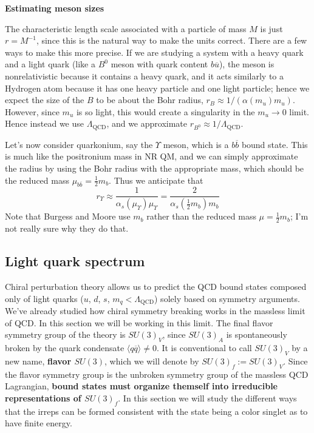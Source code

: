 \documentclass[11pt, oneside]{article}   	%
\theoremstyle{definition}
\numberwithin{equation}{subsection}		%
\newenvironment{answer}{\begin{center}\begin{answerbox}}{\end{answerbox}\end{center}}
\begin{document}

\begin{answer}
\textbf{Estimating meson sizes} 

\begin{flushleft} \setlength{\parindent}{2em}
The characteristic length scale associated with a particle of mass $M$ is just $r = M^{-1}$, since this is the natural way to make the units 
correct. There are a few ways to make this more precise. If we are studying a system with a heavy quark and a light quark (like a $B^0$ 
meson with quark content $b\overline u$), the meson is nonrelativistic because it contains a heavy quark, and it acts similarly to a 
Hydrogen atom because it has one heavy particle and one light particle; hence we expect the size of the $B$ to be about the Bohr 
radius, $r_B\approx 1 / (\alpha(m_u) m_u)$. However, since $m_u$ is so light, this would create a singularity in the $m_u\rightarrow 0$ 
limit. Hence instead we use $\Lambda_\mathrm{QCD}$, and we approximate $r_{B^0}\approx 1 / \Lambda_\mathrm{QCD}$. 

Let's now consider quarkonium, say the $\Upsilon$ meson, which is a $b\overline b$ bound state. This is much like the positronium 
mass in NR QM, and we can simply approximate the radius by using the Bohr radius with the appropriate mass, which should be the 
reduced mass $\mu_{b\overline b} = \frac{1}{2} m_b$. Thus we anticipate that
\begin{equation}
	r_\Upsilon\approx \frac{1}{\alpha_s(\mu_\Upsilon)\mu_\Upsilon} = \frac{2}{\alpha_s(\frac{1}{2} m_b) m_b} 
\end{equation}
Note that Burgess and Moore use $m_b$ rather than the reduced mass $\mu = \frac{1}{2} m_b$; I'm not really sure why they do that.
\end{flushleft}
\end{answer}

\subsection{Light quark spectrum}

Chiral perturbation theory allows us to predict the QCD bound states composed only of light quarks ($u$, $d$, $s$, $m_q < \Lambda_\mathrm{QCD}$) 
solely based on symmetry arguments. We've already studied how chiral symmetry breaking works in the massless limit of QCD. In this section we will 
be working in this limit. The final flavor symmetry group of the theory is $SU(3)_V$, since $SU(3)_A$ is spontaneously broken by the 
quark condensate $\langle q \overline q\rangle\neq 0$. It is conventional to call $SU(3)_V$ by a new name, \textbf{flavor $SU(3)$}, which 
we will denote by $SU(3)_f := SU(3)_V$. Since the flavor symmetry group is the unbroken symmetry group of the massless QCD Lagrangian, 
\textbf{bound states must organize themself into irreducible representations of $SU(3)_f$}. In this section we will study the different ways 
that the irreps can be formed consistent with the state being a color singlet as to have finite energy.
\end{document}

